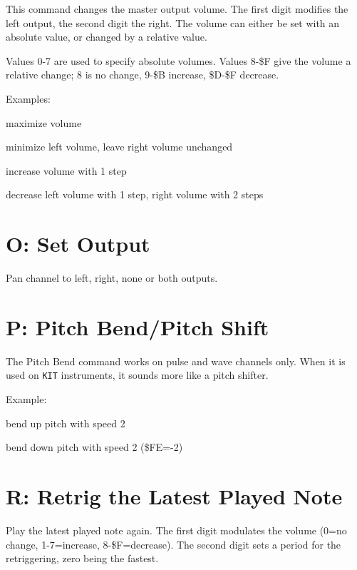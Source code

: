 This command changes the master output volume. The first digit modifies the left output, the second digit the right. The volume can either be set with an absolute value, or changed by a relative value.

Values 0-7 are used to specify absolute volumes. Values 8-\$F give the volume a relative change; 8 is no change, 9-\$B increase, \$D-\$F decrease.

\begin{description}
\item Examples:
\item[M77] maximize volume
\item[M08] minimize left volume, leave right volume unchanged
\item[M99] increase volume with 1 step
\item[MFE] decrease left volume with 1 step, right volume with 2 steps
\end{description}

\section{O: Set Output}

Pan channel to left, right, none or both outputs.

\section{P: Pitch Bend/Pitch Shift}

The Pitch Bend command works on pulse and wave channels only. When it is used on \texttt{KIT} instruments, it sounds more like a pitch shifter.

\begin{description}
\item Example:
\item[P02] bend up pitch with speed 2
\item[PFE] bend down pitch with speed 2 (\$FE=-2)
\end{description}

\section{R: Retrig the Latest Played Note}

Play the latest played note again. The first digit modulates the volume (0=no change, 1-7=increase, 8-\$F=decrease). The second digit sets a period for the retriggering, zero being the fastest.

